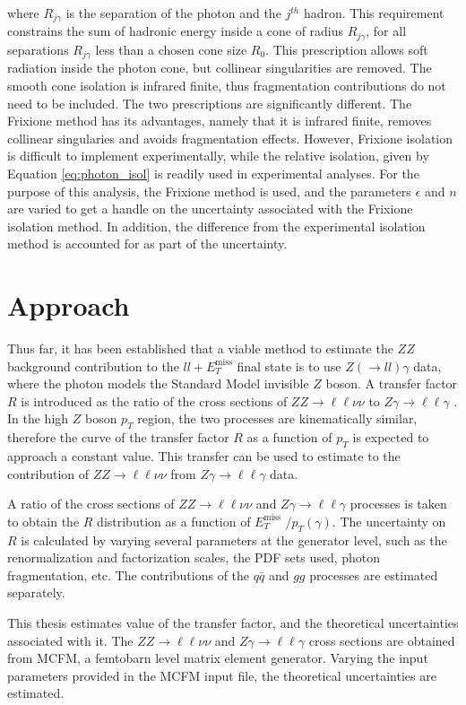\documentclass[11pt,a4paper,openright,twoside]{report}
\newcommand{\ZZ}{$ZZ\to \ell\ell\nu\nu$ }
\newcommand{\Zg}{$Z\gamma\to \ell\ell\gamma$ }
\newcommand{\met}{$E_T^{\mathrm{miss}}$ }
\begin{document}
where $R_{j\gamma}$ is the separation of the photon and the $j^{th}$ hadron. This requirement constrains the sum of hadronic energy inside a cone of radius $R_{j\gamma}$, for all separations $R_{j\gamma}$ less than a chosen cone size $R_0$. This prescription allows soft radiation inside the photon cone, but collinear singularities are removed. The smooth cone isolation is infrared finite, thus fragmentation contributions do not need to be included. The two prescriptions are significantly different. The Frixione method has its advantages, namely that it is infrared finite, removes collinear singularies and avoids fragmentation effects. However, Frixione isolation is difficult to implement experimentally, while the relative isolation, given by Equation \ref{eq:photon_isol} is readily used in experimental analyses. For the purpose of this analysis, the Frixione method is used, and the parameters $\epsilon$ and $n$ are varied to get a handle on the uncertainty associated with the Frixione isolation method. In addition, the difference from the experimental isolation method is accounted for as part of the uncertainty.

\section{Approach}
Thus far, it has been established that a viable method to estimate the $ZZ$ background contribution to the $ll+$\met final state is to use $Z(\to ll)\gamma$ data, where the photon models the Standard Model invisible $Z$ boson. A transfer factor $R$ is introduced as the ratio of the cross sections of \ZZ to \Zg. In the high $Z$ boson $p_T$ region, the two processes are kinematically similar, therefore the curve of the transfer factor $R$ as a function of $p_T$ is expected to approach a constant value. This transfer can be used to estimate to the contribution of \ZZ from \Zg data.

A ratio of the cross sections of \ZZ and \Zg processes is taken to obtain the $R$ distribution as a function of \met/$p_T(\gamma)$. The uncertainty on $R$ is calculated by varying several parameters at the generator level, such as the renormalization and factorization scales, the PDF sets used, photon fragmentation, etc. The contributions of the $q \bar{q}$ and $gg$ processes are estimated separately.

This thesis estimates value of the transfer factor, and the theoretical uncertainties associated with it. The \ZZ and \Zg cross sections are obtained from MCFM, a femtobarn level matrix element generator. Varying the input parameters provided in the MCFM input file, the theoretical uncertainties are estimated.
\end{document}
